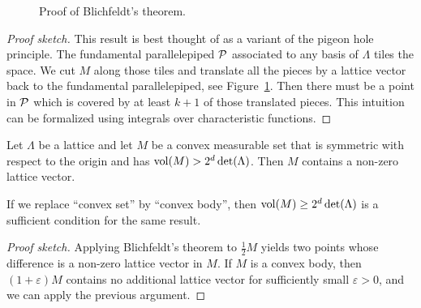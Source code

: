 \begin{figure}
\begin{center}
  \end{center}
  \caption{Proof of Blichfeldt's theorem.}
  \label{fig:blichfeldt-theorem}
\end{figure}
\begin{proof}[Proof sketch]
  This result is best thought of as a variant of the pigeon hole principle.
  The fundamental parallelepiped $\mathcal{P}$ associated to any basis of $\Lambda$
  tiles the space.
  We cut $M$ along those tiles and translate all the pieces by a lattice vector
  back to the fundamental parallelepiped,
  see Figure~\ref{fig:blichfeldt-theorem}.
  Then there must be a point in $\mathcal{P}$ which is covered by at least $k+1$ of those translated pieces.
  This intuition can be formalized using integrals over characteristic functions.
\end{proof}

\begin{theorem}
  \label{thm:minkowski-first}
  Let $\Lambda$ be a lattice
  and let $M$ be a convex measurable set that is symmetric with respect to the origin
  and has $\operatorname{vol}(M) > 2^d \det(\Lambda)$.
  Then $M$ contains a non-zero lattice vector.

  If we replace ``convex set'' by ``convex body'',
  then $\operatorname{vol}(M) \geq 2^d \det(\Lambda)$ is a sufficient condition for the same result.
\end{theorem}
\begin{proof}[Proof sketch]
  Applying Blichfeldt's theorem to $\frac{1}{2} M$
  yields two points whose difference is a non-zero lattice vector in $M$.
  If $M$ is a convex body,
  then $(1 + \varepsilon) M$ contains no additional lattice vector for sufficiently small $\varepsilon > 0$,
  and we can apply the previous argument.
\end{proof}


